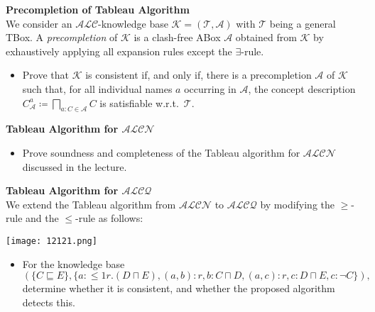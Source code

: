 \documentclass[12pt,a4paper]{article}
\newenvironment{problem}[2][{\color{red}Question}]{\begin{trivlist}
\item[\hskip \labelsep {\bfseries #1}\hskip \labelsep {\bfseries #2.}]}{\end{trivlist}}
\begin{document}
\begin{problem}{{\color{red}8}}
\textbf{Precompletion of Tableau Algorithm}\\
We consider an $\mathcal{ALC}$-knowledge base $\mathcal{K}=(\mathcal{T},\mathcal{A})$ with $\mathcal{T}$ being a general TBox. A \emph{precompletion} of $\mathcal{K}$ is a clash-free ABox $\mathcal{A}$ obtained from $\mathcal{K}$ by exhaustively applying all expansion rules except the $\exists$-rule.

\begin{itemize}
    \item[-] Prove that $\mathcal{K}$ is consistent if, and only if, there is a precompletion $\mathcal{A}$ of $\mathcal{K}$ such that, for all individual names $a$ occurring in $\mathcal{A}$, the concept description $C^{a}_{\mathcal{A}}\coloneqq\underset{a: C\in\mathcal{A}}{\bigsqcap}C$ is satisfiable w.r.t.\ $\mathcal{T}$.
\end{itemize}
\end{problem}


\begin{problem}{{\color{red}9}}
\textbf{Tableau Algorithm for $\mathcal{ALCN}$}
\begin{itemize}
\item[-] Prove soundness and completeness of the Tableau algorithm for $\mathcal{ALCN}$ discussed in the lecture.
\end{itemize}
\end{problem}


\begin{problem}{{\color{red}10}}
\textbf{Tableau Algorithm for $\mathcal{ALCQ}$}\\
We extend the Tableau algorithm from $\mathcal{ALCN}$ to $\mathcal{ALCQ}$ by modifying the $\geq$-rule and the $\leq$-rule as follows:
\begin{center}
    \texttt{[image: 12121.png]}
    \end{center}
    \begin{itemize}
\item[-] For the knowledge base
    \[(\{C\sqsubseteq E\}, \{a:{\leq}{1r}.(D\sqcap E), (a, b) : r, b : C\sqcap D, (a, c) : r, c: D\sqcap E, c : \neg C\}),\]determine whether it is consistent, and whether the proposed algorithm detects this.
\end{itemize}
\end{problem}
\end{document}
